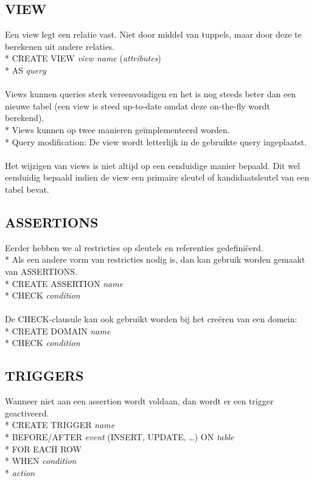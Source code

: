 \documentclass[10pt]{article}
\begin{document}
\subsection{VIEW}
Een view legt een relatie vast. Niet door middel van tuppels, maar door deze te berekenen uit andere relaties.\\*
CREATE VIEW \textit{view name} (\textit{attributes})\\*
AS \textit{query}\\\\
Views kunnen queries sterk vereenvoudigen en het is nog steeds beter dan een nieuwe tabel (een view is steed up-to-date omdat deze on-the-fly wordt berekend).\\*
Views kunnen op twee manieren ge\"implementeerd worden.\\*
Query modification: De view wordt letterlijk in de gebruikte query ingeplaatst.\\\\
Het wijzigen van views is niet altijd op een eenduidige manier bepaald. Dit wel eenduidig bepaald indien de view een primaire sleutel of kandidaatsleutel van een tabel bevat.
\subsection{ASSERTIONS}
Eerder hebben we al restricties op sleutels en referenties gedefini\"eerd.\\*
Als een andere vorm van restricties nodig is, dan kan gebruik worden gemaakt van ASSERTIONS.\\*
CREATE ASSERTION \textit{name}\\*
CHECK \textit{condition}\\\\
De CHECK-clausule kan ook gebruikt worden bij het cre\"eren van een domein:\\*
CREATE DOMAIN \textit{name}\\*
CHECK \textit{condition}
\subsection{TRIGGERS}
Wanneer niet aan een assertion wordt voldaan, dan wordt er een trigger geactiveerd.\\*
CREATE TRIGGER \textit{name}\\*
BEFORE/AFTER \textit{event} (INSERT, UPDATE, \dots) ON \textit{table}\\*
FOR EACH ROW\\*
WHEN \textit{condition}\\*
\textit{action}
\end{document}
